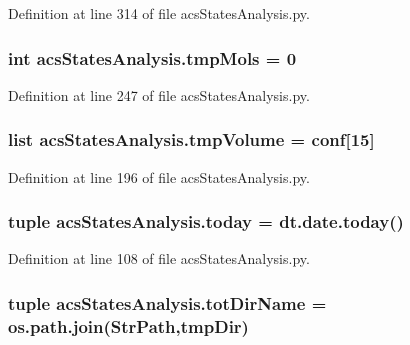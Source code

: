 Definition at line 314 of file acs\-States\-Analysis.\-py.

\hypertarget{a00099_aa24f8efad70335a8460f68902001ce64}{
\subsubsection[{tmp\-Mols}]{\setlength{\rightskip}{0pt plus 5cm}int acs\-States\-Analysis.\-tmp\-Mols = 0}}\label{a00099_aa24f8efad70335a8460f68902001ce64}


Definition at line 247 of file acs\-States\-Analysis.\-py.

\hypertarget{a00099_a1d189b8706c1c2299764d3cfd2ba08d9}{
\subsubsection[{tmp\-Volume}]{\setlength{\rightskip}{0pt plus 5cm}list acs\-States\-Analysis.\-tmp\-Volume = {\bf conf}\mbox{[}15\mbox{]}}}\label{a00099_a1d189b8706c1c2299764d3cfd2ba08d9}


Definition at line 196 of file acs\-States\-Analysis.\-py.

\hypertarget{a00099_ac99ee9d8196d8a2305b9f4c795b23b97}{
\subsubsection[{today}]{\setlength{\rightskip}{0pt plus 5cm}tuple acs\-States\-Analysis.\-today = dt.\-date.\-today()}}\label{a00099_ac99ee9d8196d8a2305b9f4c795b23b97}


Definition at line 108 of file acs\-States\-Analysis.\-py.

\hypertarget{a00099_af4bd99f6cdaec32f48ed0074208b4f0c}{
\subsubsection[{tot\-Dir\-Name}]{\setlength{\rightskip}{0pt plus 5cm}tuple acs\-States\-Analysis.\-tot\-Dir\-Name = os.\-path.\-join({\bf Str\-Path},tmp\-Dir)}}\label{a00099_af4bd99f6cdaec32f48ed0074208b4f0c}


